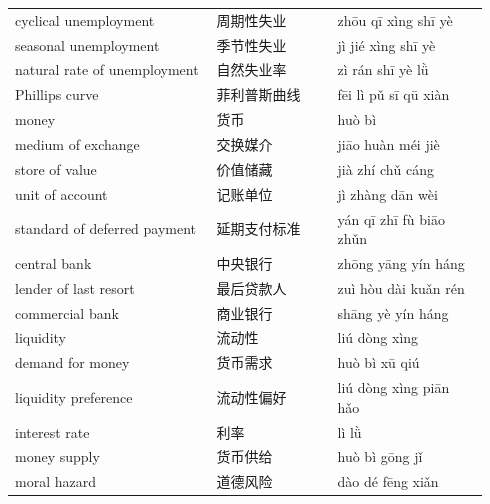 \documentclass[11pt]{article}
\begin{document}
\begin{longtable}{@{}p{0.40\linewidth}p{0.24\linewidth}p{0.30\linewidth}@{}}
cyclical unemployment & 周期性失业 & zhōu qī xìng shī yè \\
seasonal unemployment & 季节性失业 & jì jié xìng shī yè \\
natural rate of unemployment & 自然失业率 & zì rán shī yè lǜ \\
Phillips curve & 菲利普斯曲线 & fēi lì pǔ sī qū xiàn \\
money & 货币 & huò bì \\
medium of exchange & 交换媒介 & jiāo huàn méi jiè \\
store of value & 价值储藏 & jià zhí chǔ cáng \\
unit of account & 记账单位 & jì zhàng dān wèi \\
standard of deferred payment & 延期支付标准 & yán qī zhī fù biāo zhǔn \\
central bank & 中央银行 & zhōng yāng yín háng \\
lender of last resort & 最后贷款人 & zuì hòu dài kuǎn rén \\
commercial bank & 商业银行 & shāng yè yín háng \\
liquidity & 流动性 & liú dòng xìng \\
demand for money & 货币需求 & huò bì xū qiú \\
liquidity preference & 流动性偏好 & liú dòng xìng piān hǎo \\
interest rate & 利率 & lì lǜ \\
money supply & 货币供给 & huò bì gōng jǐ \\
moral hazard & 道德风险 & dào dé fēng xiǎn \\
\end{longtable}
\end{document}
